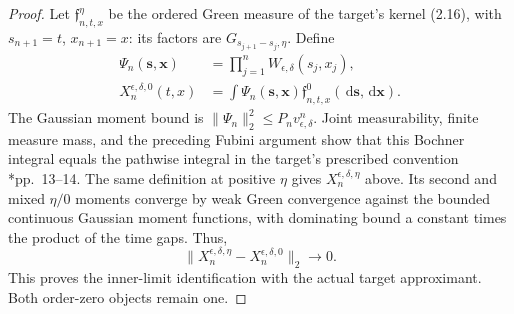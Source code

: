 \documentclass[12pt]{article}
\numberwithin{equation}{section}
\theoremstyle{definition}
\newcommand{\ud}{\,\mathrm{d}}
\begin{document}
\begin{proof}
  Let $\mathfrak{f}_{n,t,x}^{\eta}$ be the ordered Green measure
  of the target's kernel (2.16), with $s_{n+1}=t$, $x_{n+1}=x$:
  its factors are $G_{s_{j+1}-s_j,\eta}$.
  Define
  \[
    \begin{split}
      \Psi_n(\mathbf s,\mathbf x)
      &=\prod_{j=1}^nW_{\epsilon,\delta}(s_j,x_j),\\
      X_n^{\epsilon,\delta,0}(t,x)
      &=\int\Psi_n(\mathbf s,\mathbf x)
      \mathfrak f_{n,t,x}^{0}(\ud\mathbf s,\ud\mathbf x).
    \end{split}
  \]
  The Gaussian moment bound is
  $\|\Psi_n\|_2^2\le P_nv_{\epsilon,\delta}^n$.
  Joint measurability, finite measure mass, and the preceding
  Fubini argument show that this Bochner integral equals the
  pathwise integral in the target's prescribed convention
  \cite{chen:author2026:time-dependency}*{pp.~13--14}.
  The same definition at positive $\eta$ gives
  $X_n^{\epsilon,\delta,\eta}$ above.
  Its second and mixed $\eta/0$ moments converge by weak Green
  convergence against the bounded continuous Gaussian moment
  functions, with dominating bound a constant times the product
  of the time gaps. Thus,
  \[
    \|X_n^{\epsilon,\delta,\eta}
    -X_n^{\epsilon,\delta,0}\|_2\longrightarrow0.
  \]
  This proves the inner-limit identification with the actual
  target approximant. Both order-zero objects remain one.


\end{proof}
\end{document}
